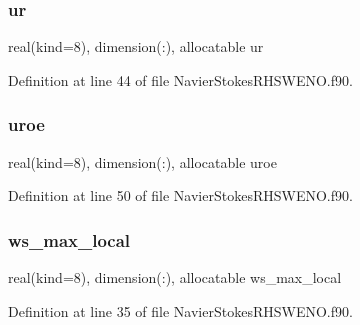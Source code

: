 \subsubsection{\texorpdfstring{ur}{ur}}
{\footnotesize\ttfamily real(kind=8), dimension(\+:), allocatable ur}



Definition at line 44 of file Navier\+Stokes\+R\+H\+S\+W\+E\+N\+O.\+f90.

\hypertarget{structnavierstokesrhsweno_1_1dissipation__local_a4b35081ba10de71781c05a62571d76a5}{}\label{structnavierstokesrhsweno_1_1dissipation__local_a4b35081ba10de71781c05a62571d76a5} 
\subsubsection{\texorpdfstring{uroe}{uroe}}
{\footnotesize\ttfamily real(kind=8), dimension(\+:), allocatable uroe}



Definition at line 50 of file Navier\+Stokes\+R\+H\+S\+W\+E\+N\+O.\+f90.

\hypertarget{structnavierstokesrhsweno_1_1dissipation__local_ade9928700968509795bd1dfaeef801e1}{}\label{structnavierstokesrhsweno_1_1dissipation__local_ade9928700968509795bd1dfaeef801e1} 
\subsubsection{\texorpdfstring{ws\+\_\+max\+\_\+local}{ws\_max\_local}}
{\footnotesize\ttfamily real(kind=8), dimension(\+:), allocatable ws\+\_\+max\+\_\+local}



Definition at line 35 of file Navier\+Stokes\+R\+H\+S\+W\+E\+N\+O.\+f90.

\hypertarget{structnavierstokesrhsweno_1_1dissipation__local_a974daf7d59045a31176e0584a1864dfd}{}\label{structnavierstokesrhsweno_1_1dissipation__local_a974daf7d59045a31176e0584a1864dfd} 
